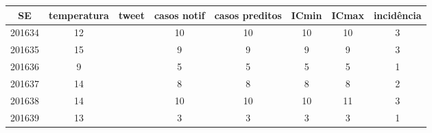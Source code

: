 \begin{tabular}{c|ccccccc}
  \hline
SE & temperatura & tweet & casos notif & casos preditos & ICmin & ICmax & incidência \\ 
  \hline
201634 & 12 &  & 10 & 10 & 10 & 10 & 3 \\ 
  201635 & 15 &  & 9 & 9 & 9 & 9 & 3 \\ 
  201636 & 9 &  & 5 & 5 & 5 & 5 & 1 \\ 
  201637 & 14 &  & 8 & 8 & 8 & 8 & 2 \\ 
  201638 & 14 &  & 10 & 10 & 10 & 11 & 3 \\ 
  201639 & 13 &  & 3 & 3 & 3 & 3 & 1 \\ 
   \hline
\end{tabular}
